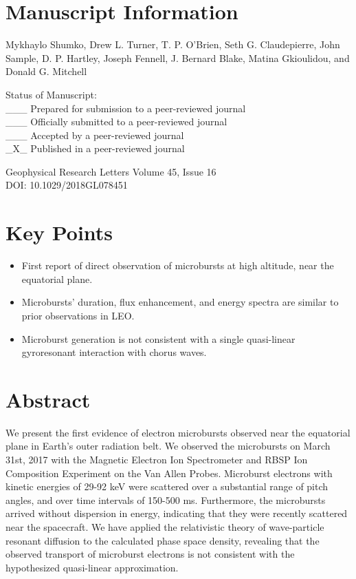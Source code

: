 \newpage

\section{Manuscript Information}

\begin{singlespace} \noindent Mykhaylo Shumko, Drew L. Turner, T. P. O'Brien, Seth G. Claudepierre, John Sample, D. P. Hartley, Joseph Fennell, J. Bernard Blake, Matina Gkioulidou, and Donald G. Mitchell \end{singlespace}

\begin{singlespace}
\noindent Status of Manuscript: \\
\_\_\_ Prepared for submission to a peer-reviewed journal \\
\_\_\_ Officially submitted to a peer-reviewed journal \\
\_\_\_ Accepted by a peer-reviewed journal \\ 
\_X\_ Published in a peer-reviewed journal
\end{singlespace}

\begin{singlespace}
\noindent Geophysical Research Letters Volume 45, Issue 16 \\
\noindent DOI: 10.1029/2018GL078451
\end{singlespace} 

\newpage

\section{Key Points}
\begin{itemize}
\item First report of direct observation of microbursts at high altitude, near the equatorial plane.
\item Microbursts' duration, flux enhancement, and energy spectra are similar to prior observations in LEO.
\item Microburst generation is not consistent with a single quasi-linear gyroresonant interaction with chorus waves.
\end{itemize}

\section{Abstract}
We present the first evidence of electron microbursts observed near the equatorial plane in Earth's outer radiation belt. We observed the microbursts on March 31st, 2017 with the Magnetic Electron Ion Spectrometer and RBSP Ion Composition Experiment on the Van Allen Probes. Microburst electrons with kinetic energies of 29-92 keV were scattered over a substantial range of pitch angles, and over time intervals of 150-500 ms. Furthermore, the microbursts arrived without dispersion in energy, indicating that they were recently scattered near the spacecraft. We have applied the relativistic theory of wave-particle resonant diffusion to the calculated phase space density, revealing that the observed transport of microburst electrons is not consistent with the hypothesized quasi-linear approximation.

